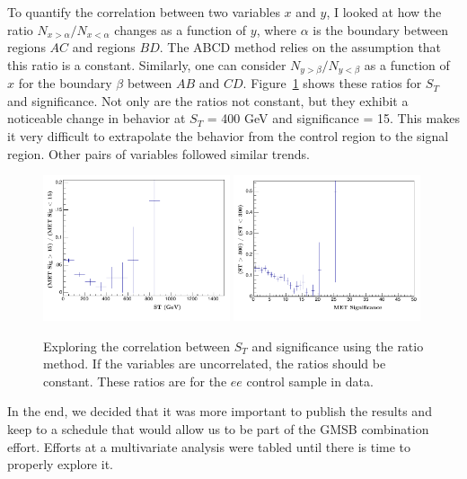 To quantify the correlation between two variables $x$ and $y$, I looked at how the ratio 
$N_{x > \alpha}/N_{x < \alpha}$ changes as a function of $y$, where $\alpha$ is the boundary between
regions $AC$ and regions $BD$. The ABCD method relies on the assumption
that this ratio is a constant.
Similarly, one can consider $N_{y > \beta}/N_{y < \beta}$ as a function 
of $x$ for the boundary $\beta$ between $AB$ and $CD$. Figure~\ref{fig:kappa} shows these ratios 
for $S_T$ and \ETmiss significance. Not only are the ratios not constant,
but they exhibit a noticeable change in behavior at $S_T$ = 400 GeV and \ETmiss 
significance = 15. This makes it very difficult to extrapolate the behavior from the control
region to the signal region. Other pairs of variables followed similar trends. 

\begin{figure}[h]
\begin{center}
\includegraphics[width=0.49\textwidth]{Figures/Appendix/kappa1.pdf}
\includegraphics[width=0.49\textwidth]{Figures/Appendix/kappa2.pdf}
\end{center}
\caption[Exploring the correlation between $S_T$ and \ETmiss significance using
the ratio method.]
{Exploring the correlation between $S_T$ and \ETmiss significance using
the ratio method. If the variables are uncorrelated, the ratios should be constant. These
ratios are for the $ee$ control sample in data.}
\label{fig:kappa}
\end{figure}

In the end, we decided that it was more important to publish the results and keep to 
a schedule that would allow us to be part of the GMSB combination effort. Efforts at a 
multivariate analysis were tabled until there is time to properly explore it.


